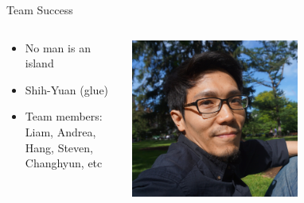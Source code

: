 \documentclass[aspectratio=43]{beamer}
\begin{document}
\begin{frame}{Team Success}
\begin{columns}
	\begin{column}{0.55\textwidth}
		\begin{itemize}
			\item No man is an island
			\item \alert{Shih-Yuan} (glue)
\item Team members: Liam, Andrea, Hang, Steven, Changhyun, etc
		\end{itemize}
	\end{column}
	\begin{column}{0.45\textwidth}
		\centering
		\includegraphics[width=0.6\textwidth]{fig/liu.jpg}
	\end{column}
\end{columns}

\end{frame}
\end{document}
